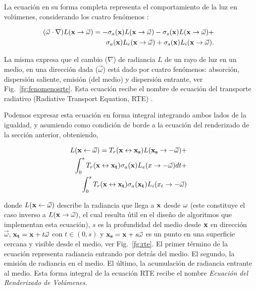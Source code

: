 La ecuación en su forma completa representa el comportamiento de la luz en volúmenes, considerando los cuatro fenómenos \cite{Jarosz2008}:

\begin{equation}
\begin{aligned}
(\vec{\omega} \cdot \nabla) L(\bold{x} \rightarrow \vec{\omega}) = - \sigma_{a}(\bold{x}) L(\bold{x} \rightarrow \vec{\omega}) - \sigma_{s}(\bold{x}) L(\bold{x} \rightarrow \vec{\omega}) + \\
\sigma_{a}(\bold{x}) L_{e}(\bold{x} \rightarrow \vec{\omega}) + \sigma_{s}(\bold{x}) L_{i}(\bold{x} \rightarrow \vec{\omega}).
\end{aligned}
\end{equation}

La misma expresa que el cambio ($\nabla$) de radiancia $L$ de un rayo de luz en un medio, en una dirección dada ($\vec{\omega}$) está dado por cuatro fenómenos: absorción, dispersión saliente, emisión (del medio) y dispersión entrante, ver Fig.~\ref{fg:fenomenosrte}.
Esta ecuación recibe el nombre de ecuación del transporte radiativo (Radiative Transport Equation, \acrshort{RTE}) \cite{Chandrasekhar1960}.

Podemos expresar esta ecuación en forma integral integrando ambos lados de la igualdad, y asumiendo como condición de borde a la ecuación del renderizado de la sección anterior, obteniendo,

\begin{equation}
\begin{aligned}
L(\bold{x} \leftarrow \vec{\omega}) = T_{r}(\bold{x} \leftrightarrow \bold{x_{s}}) L(\bold{x_{s}} \rightarrow -\vec{\omega}) + \\
\int_{0}^{s}{T_{r}(\bold{x} \leftrightarrow \bold{x_{t}}) \sigma_{a}(\bold{x}) L_{e}(x \rightarrow -\vec{\omega}) dt } + \\
\int_{0}^{s}{T_{r}(\bold{x} \leftrightarrow \bold{x_{t}}) \sigma_{a}(\bold{x_{t}}) L_{i}(x_{t} \rightarrow -\vec{\omega})  }
\end{aligned}
\label{eq:rteintegral}
\end{equation}

donde $L(\bold{x} \leftarrow \vec{\omega})$ describe la radiancia que llega a $\bold{x}$ desde $\bold{\omega}$ (este constituye el caso inverso a $L(\bold{x} \rightarrow {\vec{\omega}})$, el cual resulta útil en el diseño de algoritmos que implementan esta ecuación), $s$ es la profundidad del medio desde $\bold{x}$ en dirección $\vec{\omega}$, $\bold{x_{t}} = \bold{x} + t\vec{\omega}$ con $t \in (0,s)$ y $\bold{x_{s}} = \bold{x}+ s\vec{\omega}$ es un punto en una superficie cercana y visible desde el medio, ver Fig.~\ref{fg:rte}.
El primer término de la ecuación representa radiancia entrando por detrás del medio.
El segundo, la emisión de radiancia en el medio.
El último, la acumulación de radiancia entrante al medio. 
Esta forma integral de la ecuación RTE recibe el nombre {\em Ecuación del Renderizado de Volúmenes}.

